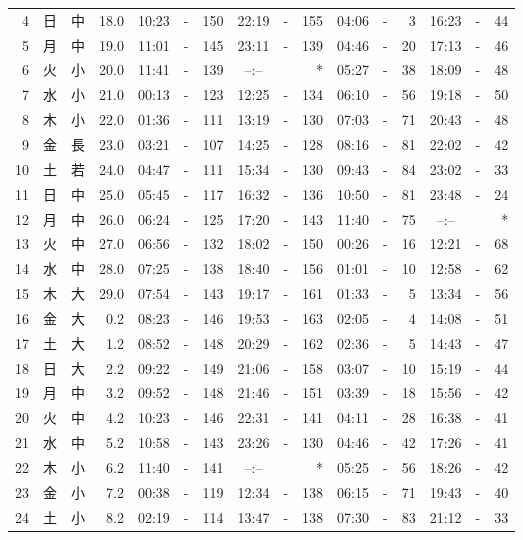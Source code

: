 \documentclass[12pt.a4j]{jsarticle}
\begin{document}
\begin{center}
\begin{table}[ht]
\begin{tabular}{|rc|cr|ccrccr|ccrccr|}
 4 & 日 & 中 & 18.0 & 10:23 &-& 150 & 22:19 &-& 155 & 04:06 &-&   3 & 16:23 &-&  44 \\
 5 & 月 & 中 & 19.0 & 11:01 &-& 145 & 23:11 &-& 139 & 04:46 &-&  20 & 17:13 &-&  46 \\
 6 & 火 & 小 & 20.0 & 11:41 &-& 139 & --:-- & &  *  & 05:27 &-&  38 & 18:09 &-&  48 \\
 7 & 水 & 小 & 21.0 & 00:13 &-& 123 & 12:25 &-& 134 & 06:10 &-&  56 & 19:18 &-&  50 \\
 8 & 木 & 小 & 22.0 & 01:36 &-& 111 & 13:19 &-& 130 & 07:03 &-&  71 & 20:43 &-&  48 \\
 9 & 金 & 長 & 23.0 & 03:21 &-& 107 & 14:25 &-& 128 & 08:16 &-&  81 & 22:02 &-&  42 \\
10 & 土 & 若 & 24.0 & 04:47 &-& 111 & 15:34 &-& 130 & 09:43 &-&  84 & 23:02 &-&  33 \\
11 & 日 & 中 & 25.0 & 05:45 &-& 117 & 16:32 &-& 136 & 10:50 &-&  81 & 23:48 &-&  24 \\
12 & 月 & 中 & 26.0 & 06:24 &-& 125 & 17:20 &-& 143 & 11:40 &-&  75 & --:-- & &  *  \\
13 & 火 & 中 & 27.0 & 06:56 &-& 132 & 18:02 &-& 150 & 00:26 &-&  16 & 12:21 &-&  68 \\
14 & 水 & 中 & 28.0 & 07:25 &-& 138 & 18:40 &-& 156 & 01:01 &-&  10 & 12:58 &-&  62 \\
15 & 木 & 大 & 29.0 & 07:54 &-& 143 & 19:17 &-& 161 & 01:33 &-&   5 & 13:34 &-&  56 \\
16 & 金 & 大 &  0.2 & 08:23 &-& 146 & 19:53 &-& 163 & 02:05 &-&   4 & 14:08 &-&  51 \\
17 & 土 & 大 &  1.2 & 08:52 &-& 148 & 20:29 &-& 162 & 02:36 &-&   5 & 14:43 &-&  47 \\
18 & 日 & 大 &  2.2 & 09:22 &-& 149 & 21:06 &-& 158 & 03:07 &-&  10 & 15:19 &-&  44 \\
19 & 月 & 中 &  3.2 & 09:52 &-& 148 & 21:46 &-& 151 & 03:39 &-&  18 & 15:56 &-&  42 \\
20 & 火 & 中 &  4.2 & 10:23 &-& 146 & 22:31 &-& 141 & 04:11 &-&  28 & 16:38 &-&  41 \\
21 & 水 & 中 &  5.2 & 10:58 &-& 143 & 23:26 &-& 130 & 04:46 &-&  42 & 17:26 &-&  41 \\
22 & 木 & 小 &  6.2 & 11:40 &-& 141 & --:-- & &  *  & 05:25 &-&  56 & 18:26 &-&  42 \\
23 & 金 & 小 &  7.2 & 00:38 &-& 119 & 12:34 &-& 138 & 06:15 &-&  71 & 19:43 &-&  40 \\
24 & 土 & 小 &  8.2 & 02:19 &-& 114 & 13:47 &-& 138 & 07:30 &-&  83 & 21:12 &-&  33 \\

\end{tabular}
\end{table}
\end{center}
\end{document}
